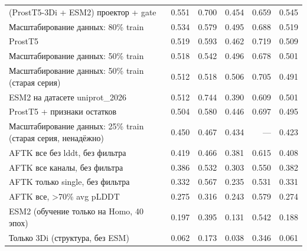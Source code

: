 \begin{longtable}{p{7.2cm} r r r r r}
(ProstT5-3Di + ESM2) проектор + gate & 0.551 & 0.700 & 0.454 & 0.659 & 0.545 \\
Масштабирование данных: 80\% train & 0.534 & 0.579 & 0.495 & 0.688 & 0.519 \\
ProstT5 & 0.519 & 0.593 & 0.462 & 0.719 & 0.509 \\
Масштабирование данных: 50\% train & 0.518 & 0.542 & 0.496 & 0.678 & 0.501 \\
Масштабирование данных: 50\% train (старая серия) & 0.512 & 0.518 & 0.506 & 0.705 & 0.491 \\
ESM2 на датасете uniprot\_2026 & 0.512 & 0.744 & 0.390 & 0.609 & 0.501 \\
ProstT5 + признаки остатков & 0.504 & 0.580 & 0.446 & 0.697 & 0.495 \\
Масштабирование данных: 25\% train (старая серия, ненадёжно) & 0.450 & 0.467 & 0.434 & — & 0.423 \\
AFTK все без lddt, без фильтра & 0.419 & 0.466 & 0.381 & 0.615 & 0.408 \\
AFTK все каналы, без фильтра & 0.386 & 0.532 & 0.303 & 0.550 & 0.382 \\
AFTK только single, без фильтра & 0.332 & 0.567 & 0.235 & 0.531 & 0.331 \\
AFTK все, \textgreater{}70\% avg pLDDT & 0.275 & 0.316 & 0.243 & 0.579 & 0.274 \\
ESM2 (обучение только на Homo, 40 эпох) & 0.197 & 0.395 & 0.131 & 0.542 & 0.188 \\
Только 3Di (структура, без ESM) & 0.062 & 0.173 & 0.038 & 0.346 & 0.061 \\
\end{longtable}
